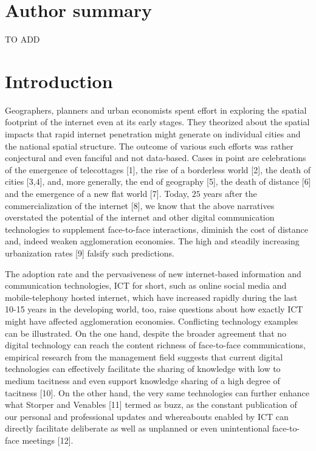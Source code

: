 \documentclass[10pt,letterpaper]{article}
\begin{document}
\section*{Author summary}
TO ADD

\linenumbers

\hypertarget{sec:1}{%
\section{Introduction}\label{sec:1}}

Geographers, planners and urban economists spent effort in exploring the
spatial footprint of the internet even at its early stages. They
theorized about the spatial impacts that rapid internet penetration
might generate on individual cities and the national spatial structure.
The outcome of various such efforts was rather conjectural and even
fanciful and not data-based. Cases in point are celebrations of the
emergence of telecottages {[}1{]}, the rise of a borderless world
{[}2{]}, the death of cities {[}3,4{]}, and, more generally, the end of
geography {[}5{]}, the death of distance {[}6{]} and the emergence of a
new flat world {[}7{]}. Today, \(25\) years after the commercialization
of the internet {[}8{]}, we know that the above narratives overstated
the potential of the internet and other digital communication
technologies to supplement face-to-face interactions, diminish the cost
of distance and, indeed weaken agglomeration economies. The high and
steadily increasing urbanization rates {[}9{]} falsify such predictions.

The adoption rate and the pervasiveness of new internet-based
information and communication technologies, ICT for short, such as
online social media and mobile-telephony hosted internet, which have
increased rapidly during the last 10-15 years in the developing world,
too, raise questions about how exactly ICT might have affected
agglomeration economies. Conflicting technology examples can be
illustrated. On the one hand, despite the broader agreement that no
digital technology can reach the content richness of face-to-face
communications, empirical research from the management field suggests
that current digital technologies can effectively facilitate the sharing
of knowledge with low to medium tacitness and even support knowledge
sharing of a high degree of tacitness {[}10{]}. On the other hand, the
very same technologies can further enhance what Storper and Venables
{[}11{]} termed as buzz, as the constant publication of our personal and
professional updates and whereabouts enabled by ICT can directly
facilitate deliberate as well as unplanned or even unintentional
face-to-face meetings {[}12{]}.
\end{document}
